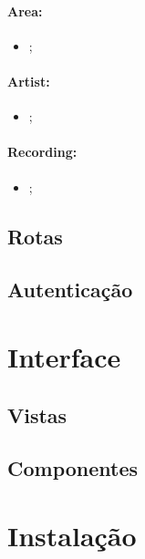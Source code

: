 \documentclass{article}
\begin{document}
\paragraph{\textbf{Area:}}
    \begin{itemize}
        \item \texttt{} ;
    \end{itemize}

\paragraph{\textbf{Artist:}}
    \begin{itemize}
        \item \texttt{} ;
    \end{itemize}

\paragraph{\textbf{Recording:}}
    \begin{itemize}
        \item \texttt{} ;
    \end{itemize}

\subsection{Rotas}

\subsection{Autenticação} \label{auth}

\section{Interface}


\subsection{Vistas}

\subsection{Componentes}

\section{Instalação}
\end{document}
